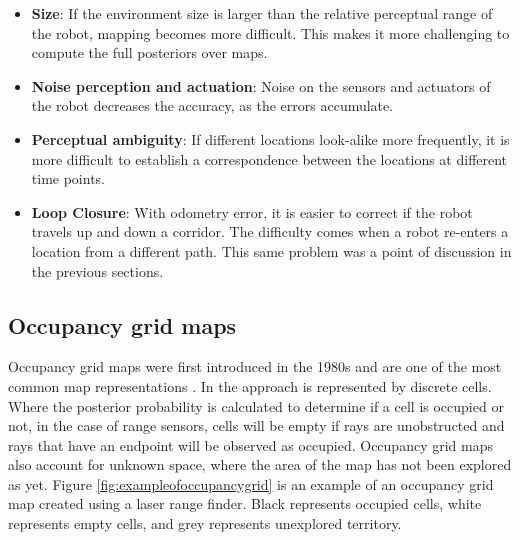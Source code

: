 \begin{itemize}
    \item \textbf{Size}: If the environment size is larger than the relative perceptual range of the robot, mapping becomes more difficult. This makes it more challenging to compute the full posteriors over maps.
    \item \textbf{Noise perception and actuation}: Noise on the sensors and actuators of the robot decreases the accuracy, as the errors accumulate.
    \item \textbf{Perceptual ambiguity}: If different locations look-alike more frequently, it is more difficult to establish a correspondence between the locations at different time points.
    \item \textbf{Loop Closure}: With odometry error, it is easier to correct if the robot travels up and down a corridor. The difficulty comes when a robot re-enters a location from a different path. This same problem was a point of discussion in the previous sections.	
\end{itemize}

\subsection{Occupancy grid maps}
Occupancy grid maps were first introduced in the 1980s and are one of the most common map representations \cite{Siciliano2008b}. In the approach is represented by discrete cells. Where the posterior probability is calculated to determine if a cell is occupied or not, in the case of range sensors, cells will be empty if rays are unobstructed and rays that have an endpoint will be observed as occupied. Occupancy grid maps also account for unknown space, where the area of the map has not been explored as yet. Figure \ref{fig:exampleofoccupancygrid} is an example of an occupancy grid map created using a laser range finder. Black represents occupied cells, white represents empty cells, and grey represents unexplored territory.

